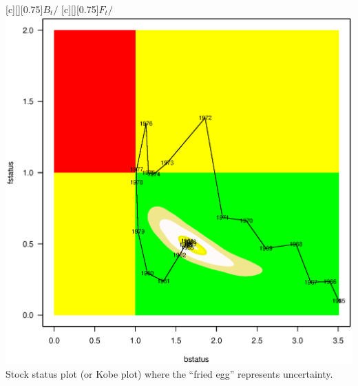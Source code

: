 \begin{multicols}{2}
\begin{figurehere}
	\centering
	[][0.75]{$B_t/$\bmsy}
	[][0.75]{$F_t/$\fmsy}
	\includegraphics[width=\columnwidth]{iscamFigs/fig7.eps}\\
	\caption{Stock status plot (or Kobe plot) where the ``fried egg'' represents uncertainty.}\label{fig7}
\end{figurehere}

\end{multicols}



